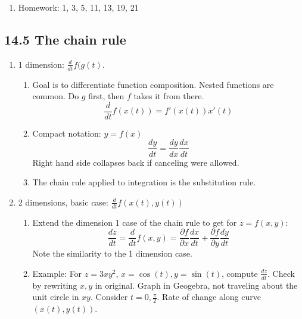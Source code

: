 \documentclass{article}
\begin{document}
\begin{enumerate}
\item Homework: 1, 3, 5, 11, 13, 19, 21

\end{enumerate}

\subsection{14.5 The chain rule}

\begin{enumerate}
\item 1 dimension: $\frac{d}{dt} f(g(t)$.
\begin{enumerate}
\item Goal is to differentiate function composition. Nested functions are common. Do $g$ first, then $f$ takes it from there.
\[
\frac{d}{dt} f(x(t)) = f'(x(t)) x'(t)
\]
\item Compact notation: $y=f(x)$
\[
\frac{dy}{dt} = \frac{dy}{dx} \frac{dx}{dt}
\]
Right hand side collapses back if canceling were allowed.
\item The chain rule applied to integration is the substitution rule.
\end{enumerate}

\item 2 dimensions, basic case: $\frac{d}{dt} f(x(t), y(t))$
\begin{enumerate}
\item Extend the dimension 1 case of the chain rule to get for $z=f(x,y)$:
\[
\frac{dz}{dt} = \frac{d}{dt} f(x,y) = \frac{\partial f}{\partial x} \frac{dx}{dt} + \frac{\partial f}{\partial y} \frac{dy}{dt}
\]
Note the similarity to the 1 dimension case.
\item Example: For $z=3xy^2$, $x=\cos(t), y=\sin(t)$, compute $\frac{dz}{dt}$. Check by rewriting $x,y$ in original. Graph in Geogebra, not traveling about the unit circle in $xy$. Consider $t=0, \frac{\pi}{2}$. Rate of change along curve $(x(t),y(t))$.
\end{enumerate}


\end{enumerate}
\end{document}
